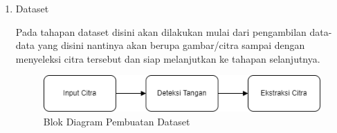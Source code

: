 \begin{enumerate}
  \item Dataset \par
  Pada tahapan dataset disini akan dilakukan mulai dari pengambilan data-data yang disini nantinya akan berupa gambar/citra sampai dengan menyeleksi citra tersebut dan siap melanjutkan ke tahapan selanjutnya.

\begin{figure}[!h]
	\centering
	\includegraphics[width=1\linewidth]{gambar/Dataset.png}
	\caption{Blok Diagram Pembuatan Dataset}
	\label{fig:gambar32}
\end{figure}


\end{enumerate}

